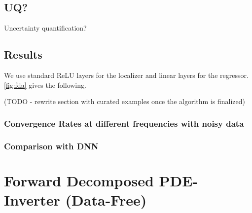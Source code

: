 \documentclass[12pt]{iopart}
\theoremstyle{break}
\begin{document}
\subsection{UQ?}
Uncertainty quantification?
	
\subsection{Results}
We use standard ReLU layers for the localizer and linear layers for the regressor. \ref{fig:fda} gives the following.

\begin{figure}[htpb]
\centering


\end{figure}

	
(TODO - rewrite section with curated examples once the algorithm is finalized)
	
\subsubsection{Convergence Rates at different frequencies with noisy data}
	

	
	
\subsubsection{Comparison with DNN}
	

	
\section{Forward Decomposed PDE-Inverter (Data-Free)}
	
\end{document}
